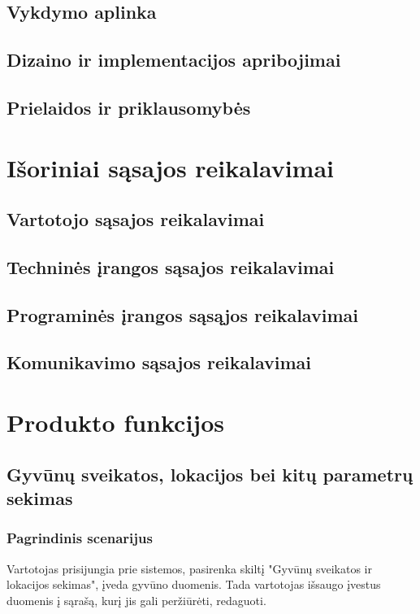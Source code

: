 \documentclass[oneside]{VUMIFPSkursinis}
\begin{document}
\subsection{Vykdymo aplinka}
\subsection{Dizaino ir implementacijos apribojimai}
\subsection{Prielaidos ir priklausomybės}

\section{Išoriniai sąsajos reikalavimai}
\subsection{Vartotojo sąsajos reikalavimai}
\subsection{Techninės įrangos sąsajos reikalavimai}
\subsection{Programinės įrangos sąsąjos reikalavimai}
\subsection{Komunikavimo sąsajos reikalavimai}

\section{Produkto funkcijos}
\subsection{Gyvūnų sveikatos, lokacijos bei kitų parametrų sekimas}
\subsubsection{Pagrindinis scenarijus}
	Vartotojas prisijungia prie sistemos, pasirenka skiltį "Gyvūnų sveikatos ir lokacijos sekimas", įveda gyvūno duomenis. Tada vartotojas išsaugo įvestus duomenis į sąrašą, kurį jis gali peržiūrėti, redaguoti.
\end{document}
